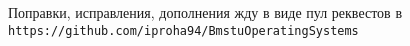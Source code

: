 \Conclusion

Поправки, исправления, дополнения жду в виде пул реквестов в\\ 
 \verb|https://github.com/iproha94/BmstuOperatingSystems|
